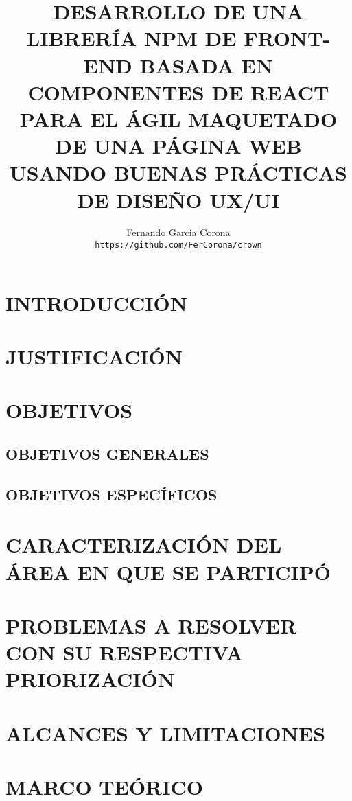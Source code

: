 \documentclass[a4paper,12pt]{report}
\author{
  Fernando Garcia Corona\\
  \texttt{https://github.com/FerCorona/crown}
}
\title{DESARROLLO DE UNA LIBRERÍA NPM DE FRONT-END BASADA EN COMPONENTES DE REACT PARA EL ÁGIL MAQUETADO DE UNA PÁGINA WEB USANDO BUENAS PRÁCTICAS DE DISEÑO UX/UI}
\begin{document}
	\maketitle
	
	\tableofcontents
	
		\chapter {INTRODUCCIÓN}
			
		\chapter {JUSTIFICACIÓN }
			
		
		\chapter {OBJETIVOS }
			\section {OBJETIVOS GENERALES}
				
			
			\section {OBJETIVOS ESPECÍFICOS} 
				
		
		\chapter {CARACTERIZACIÓN DEL ÁREA EN QUE SE PARTICIPÓ }
		
		\chapter {PROBLEMAS A RESOLVER CON SU RESPECTIVA PRIORIZACIÓN }
			
		\chapter {ALCANCES Y LIMITACIONES }
				
		
		\chapter {MARCO TEÓRICO  }
			
		
\end{document}
